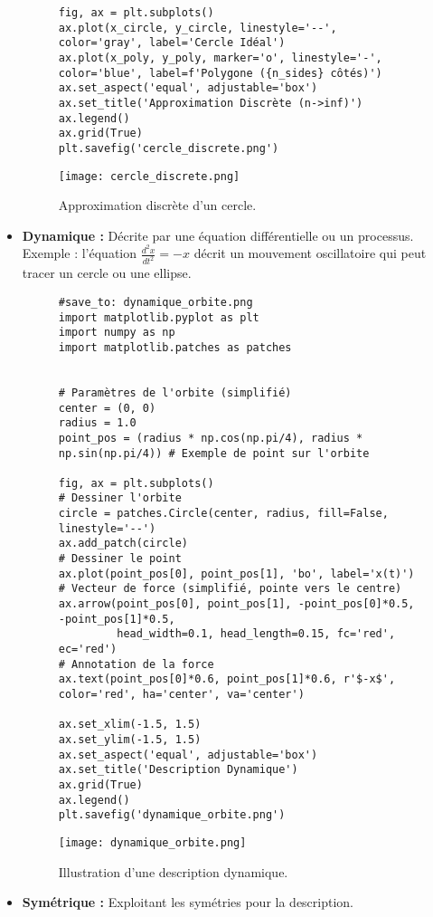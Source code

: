 \documentclass{article}
\begin{document}
\begin{itemize}
\begin{figure}[H]
\begin{verbatim}
fig, ax = plt.subplots()
ax.plot(x_circle, y_circle, linestyle='--', color='gray', label='Cercle Idéal')
ax.plot(x_poly, y_poly, marker='o', linestyle='-', color='blue', label=f'Polygone ({n_sides} côtés)')
ax.set_aspect('equal', adjustable='box')
ax.set_title('Approximation Discrète (n->inf)')
ax.legend()
ax.grid(True)
plt.savefig('cercle_discrete.png')
        \end{verbatim}
        \texttt{[image: cercle\_discrete.png]}
        \caption{Approximation discrète d'un cercle.}
        \label{fig:cercle_discrete}
    \end{figure}
    \item \textbf{Dynamique :} Décrite par une équation différentielle ou un processus. Exemple : l'équation $\frac{d^2x}{dt^2} = -x$ décrit un mouvement oscillatoire qui peut tracer un cercle ou une ellipse.
    \begin{figure}[H]
        \centering
        \begin{verbatim}
#save_to: dynamique_orbite.png
import matplotlib.pyplot as plt
import numpy as np
import matplotlib.patches as patches


# Paramètres de l'orbite (simplifié)
center = (0, 0)
radius = 1.0
point_pos = (radius * np.cos(np.pi/4), radius * np.sin(np.pi/4)) # Exemple de point sur l'orbite

fig, ax = plt.subplots()
# Dessiner l'orbite
circle = patches.Circle(center, radius, fill=False, linestyle='--')
ax.add_patch(circle)
# Dessiner le point
ax.plot(point_pos[0], point_pos[1], 'bo', label='x(t)')
# Vecteur de force (simplifié, pointe vers le centre)
ax.arrow(point_pos[0], point_pos[1], -point_pos[0]*0.5, -point_pos[1]*0.5,
         head_width=0.1, head_length=0.15, fc='red', ec='red')
# Annotation de la force
ax.text(point_pos[0]*0.6, point_pos[1]*0.6, r'$-x$', color='red', ha='center', va='center')

ax.set_xlim(-1.5, 1.5)
ax.set_ylim(-1.5, 1.5)
ax.set_aspect('equal', adjustable='box')
ax.set_title('Description Dynamique')
ax.grid(True)
ax.legend()
plt.savefig('dynamique_orbite.png')
        \end{verbatim}
        \texttt{[image: dynamique\_orbite.png]}
        \caption{Illustration d'une description dynamique.}
        \label{fig:dynamique_orbite}
    \end{figure}
    \item \textbf{Symétrique :} Exploitant les symétries pour la description.
\end{itemize}
\end{document}
